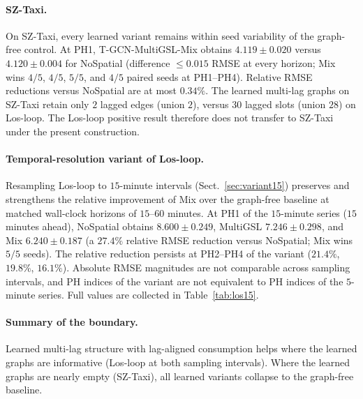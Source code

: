 \paragraph{SZ-Taxi.}
On SZ-Taxi, every learned variant remains within seed variability of the
graph-free control. At PH1, T-GCN-MultiGSL-Mix obtains $4.119\pm 0.020$
versus $4.120\pm 0.004$ for NoSpatial (difference $\le 0.015$ RMSE at every
horizon; Mix wins $4/5$, $4/5$, $5/5$, and $4/5$ paired seeds at PH1--PH4).
Relative RMSE reductions versus NoSpatial are at most $0.34\%$. The learned
multi-lag graphs on SZ-Taxi retain only $2$ lagged edges (union $2$), versus
$30$ lagged slots (union $28$) on Los-loop. The Los-loop positive result
therefore does not transfer to SZ-Taxi under the present construction.

\paragraph{Temporal-resolution variant of Los-loop.}
Resampling Los-loop to $15$-minute intervals (Sect.~\ref{sec:variant15})
preserves and strengthens the relative improvement of Mix over the graph-free
baseline at matched wall-clock horizons of $15$--$60$ minutes. At PH1 of the
$15$-minute series ($15$ minutes ahead), NoSpatial obtains
$8.600\pm 0.249$, MultiGSL $7.246\pm 0.298$, and Mix $6.240\pm 0.187$
(a $27.4\%$ relative RMSE reduction versus NoSpatial; Mix wins $5/5$ seeds).
The relative reduction persists at PH2--PH4 of the variant
($21.4\%$, $19.8\%$, $16.1\%$). Absolute RMSE magnitudes are not comparable
across sampling intervals, and PH indices of the variant are not equivalent
to PH indices of the $5$-minute series. Full values are collected in
Table~\ref{tab:los15}.

\paragraph{Summary of the boundary.}
Learned multi-lag structure with lag-aligned consumption helps where the
learned graphs are informative (Los-loop at both sampling intervals). Where
the learned graphs are nearly empty (SZ-Taxi), all learned variants collapse
to the graph-free baseline.


